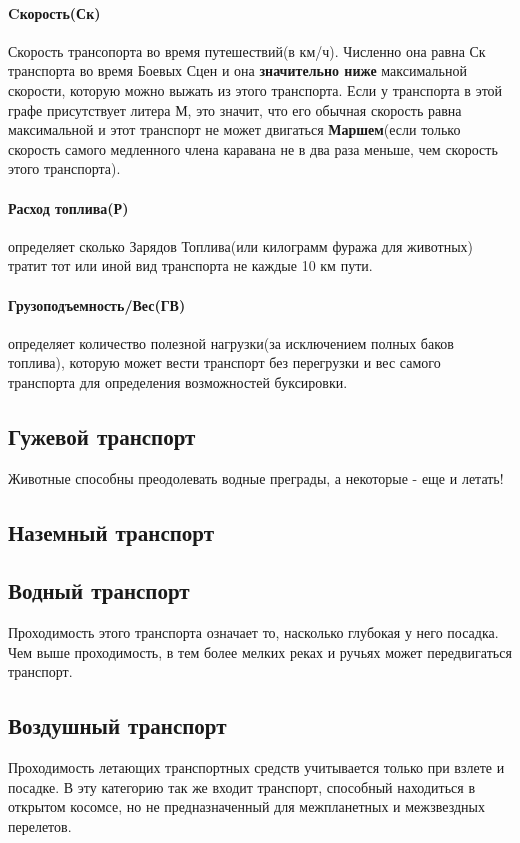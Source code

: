 \paragraph{Cкорость(Ск)} Скорость трансопорта во время путешествий(в км/ч). Численно она равна Ск транспорта во время Боевых Сцен и она \textbf{значительно ниже} максимальной скорости, которую можно выжать из этого транспорта. Если у транспорта в этой графе присутствует литера М, это значит, что его обычная скорость равна максимальной и этот транспорт не может двигаться \textbf{Маршем}(если только скорость самого медленного члена каравана не в два раза меньше, чем скорость этого транспорта).
\paragraph{Расход топлива(Р)} определяет сколько Зарядов Топлива(или килограмм фуража для животных) тратит тот или иной вид транспорта не каждые 10 км пути.
\paragraph{Грузоподъемность/Вес(ГВ)} определяет количество полезной нагрузки(за исключением полных баков топлива), которую может вести транспорт без перегрузки и вес самого транспорта для определения возможностей буксировки.

\subsection{Гужевой транспорт}
Животные способны преодолевать водные преграды, а некоторые - еще и летать!

\subsection{Наземный транспорт}

\subsection{Водный транспорт}
Проходимость этого транспорта означает то, насколько глубокая у него посадка. Чем выше проходимость, в тем более мелких реках и ручьях может передвигаться транспорт.

\subsection{Воздушный транспорт}
Проходимость летающих транспортных средств учитывается только при взлете и посадке. В эту категорию так же входит транспорт, способный находиться в открытом косомсе, но не предназначенный для межпланетных и межзвездных перелетов.

